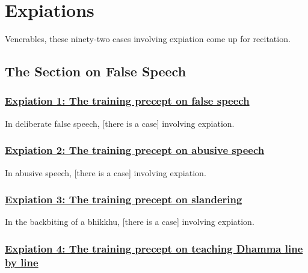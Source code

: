 
\section{Expiations}
\label{exp}

\begin{intro}
	Venerables, these ninety-two cases involving expiation come up for recitation.
\end{intro}

\setsubsecheadstyle{\subsectionFmt}
\subsection{The Section on False Speech}
\label{exp-vagga1}

\subsubsection*{\hyperref[pac1]{Expiation 1: The training precept on false speech}}
\label{exp1}

In deliberate false speech, [there is a case] involving expiation.



\subsubsection*{\hyperref[pac2]{Expiation 2: The training precept on abusive speech}}
\label{exp2}

In abusive speech, [there is a case] involving expiation.



\subsubsection*{\hyperref[pac3]{Expiation 3: The training precept on slandering}}
\label{exp3}

In the backbiting of a bhikkhu, [there is a case] involving expiation.



\subsubsection*{\hyperref[pac4]{Expiation 4: The training precept on teaching Dhamma line by line}}
\label{exp4}

